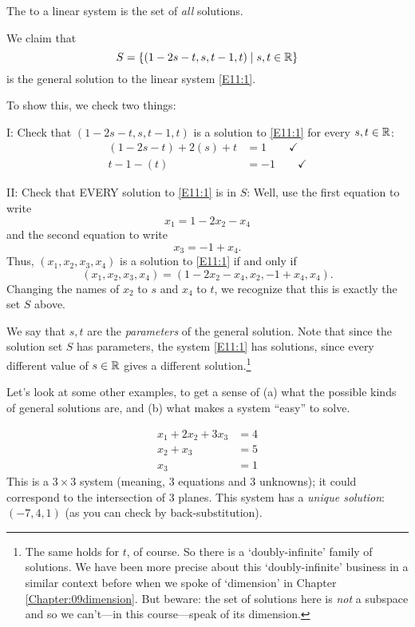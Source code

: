 \begin{definition}
The  to a linear system is the set of \emph{all}
solutions.
\end{definition}

\begin{myexample} We claim that 
$$
S = \{ (1-2s-t, s, t-1, t) \mid s,t\in \mathbb{R}\}
$$
is the general solution to the linear system \eqref{E11:1}.

To show this, we check two things:

I:  Check that $(1-2s-t, s, t-1, t)$ is a solution to  \eqref{E11:1} for
every $s,t\in\mathbb{R}$:
\begin{align*}
(1-2s-t) + 2(s) + t &= 1 \qquad \checkmark \\
t-1 - (t) &= -1 \qquad \checkmark
\end{align*}

II: Check that EVERY solution to \eqref{E11:1} is in $S$:  Well, use the 
first equation to write
$$
x_1 = 1-2x_2-x_4
$$
and the second equation to 
write
$$
x_3 = -1+x_4.
$$
Thus, $(x_1,x_2,x_3,x_4)$ is a solution to \eqref{E11:1} if and only if
$$
(x_1,x_2,x_3,x_4) = (1-2x_2-x_4,x_2, -1+x_4, x_4).
$$
Changing the names of $x_2$ to $s$ and $x_4$ to $t$, we recognize that
this is exactly the set $S$ above.

We say that $s,t$ are the \emph{parameters} of the general solution.
Note that since the solution set $S$ has parameters, the system  \eqref{E11:1} 
has  solutions, since every different value of $s\in \mathbb{R}$ gives a different solution.\footnote{The same holds for $t$, of course. So there is a `doubly-infinite' family of solutions. We have been more precise about this `doubly-infinite' business in a similar context before when we spoke of `dimension' in Chapter \ref{Chapter:09dimension}. But beware: the set of solutions here is {\it not} a subspace and so we can't---in this course---speak of its dimension. }  
\end{myexample}


Let's look at some other examples, to get a sense of (a) what the possible
kinds of general solutions are, and (b) what makes a system ``easy'' to solve.

\begin{myexample}
\begin{align*}
x_1+2x_2 + 3x_3 &= 4\\ 
x_2+x_3 &= 5\\
x_3&=1
\end{align*}
This is a $3\times 3$ system (meaning, $3$ equations and $3$ unknowns);
it could correspond to the intersection of 3 planes.  This system
has a \emph{unique solution}:  $(-7,4,1)$ (as you can check by
back-substitution).
\end{myexample}

